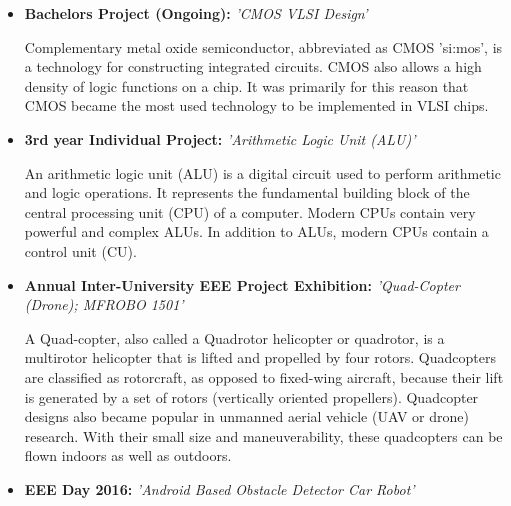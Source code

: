 \documentclass[11pt,a4paper,sans]{moderncv}        %
\begin{document}
\begin{itemize}

\item{\textbf{Bachelors Project (Ongoing):} \textit{'CMOS VLSI Design'}

\vspace{3pt}

\small{Complementary metal oxide semiconductor, abbreviated as CMOS 'si:mos', is a technology for constructing integrated circuits. CMOS also allows a high density of logic functions on a chip. It was primarily for this reason that CMOS became the most used technology to be implemented in VLSI chips.}}

\vspace{6pt}

\item{\textbf{3rd year Individual Project:} \textit{'Arithmetic Logic Unit (ALU)'}

\vspace{3pt}

\small{An arithmetic logic unit (ALU) is a digital circuit used to perform arithmetic and logic operations. It represents the fundamental building block of the central processing unit (CPU) of a computer. Modern CPUs contain very powerful and complex ALUs. In addition to ALUs, modern CPUs contain a control unit (CU).}}

\vspace{6pt}

\item{\textbf{Annual Inter-University EEE Project Exhibition:} \textit{'Quad-Copter (Drone); MFROBO 1501'}

\vspace{3pt}

\small{A Quad-copter, also called a Quadrotor helicopter or quadrotor, is a multirotor helicopter that is lifted and propelled by four rotors. Quadcopters are classified as rotorcraft, as opposed to fixed-wing aircraft, because their lift is generated by a set of rotors (vertically oriented propellers).
Quadcopter designs also became popular in unmanned aerial vehicle (UAV or drone) research. With their small size and maneuverability, these quadcopters can be flown indoors as well as outdoors.}}

\vspace{6pt}

\item{\textbf{EEE Day 2016:} \textit{'Android Based Obstacle Detector Car Robot'}

\vspace{3pt}

}
\end{itemize}
\end{document}
